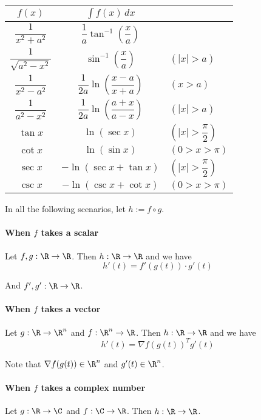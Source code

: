 \label{dbd3301}
\begin{center}
	\renewcommand{\arraystretch}{2.1}\def\d{\displaystyle}
	\begin{tabular}{c|c l}
		$f(x)$                    & $\int f(x)\,dx$                               &                    \\\hline
		$\dfrac1{x^2+a^2}$        & $\dfrac1a\tan^{-1}\left(\dfrac xa\right)$     &                    \\
		$\dfrac1{\sqrt{a^2-x^2}}$ & $\sin^{-1}\left(\dfrac xa\right)$             & $(|x|>a)$          \\
		$\dfrac1{x^2-a^2}$        & $\dfrac1{2a}\ln\left(\dfrac{x-a}{x+a}\right)$ & $(x>a)$            \\
		$\dfrac1{a^2-x^2}$        & $\dfrac1{2a}\ln\left(\dfrac{a+x}{a-x}\right)$ & $(|x|>a)$          \\
		$\tan x$                  & $\ln(\sec x)$                                 & $(|x|>\dfrac\pi2)$ \\
		$\cot x$                  & $\ln(\sin x)$                                 & $(0>x>\pi)$        \\
		$\sec x$                  & $-\ln(\sec x+\tan x)$                         & $(|x|>\dfrac\pi2)$ \\
		$\csc x$                  & $-\ln(\csc x+\cot x)$                         & $(0>x>\pi)$
	\end{tabular}
\end{center}

\label{d969d46}

In all the following scenarios, let $h:=f\circ g$.

\paragraph{When $f$ takes a scalar} Let $f,g:\R\to\R$. Then
$h:\R\to\R$ and we have
$$h'(t)=f'(g(t))\cdot g'(t)$$

And $f',g':\R\to\R$.

\paragraph{When $f$ takes a vector} Let $g:\R\to\R^n$ and
$f:\R^n\to\R$. Then $h:\R\to\R$ and we have
$$h'(t)=\nabla f(g(t))^Tg'(t)$$

Note that $\nabla f(g(t))\in\R^n$ and $g'(t)\in\R^n$.

\paragraph{When $f$ takes a complex number} Let $g:\R\to\C$ and
$f:\C\to\R$. Then $h:\R\to\R$.

